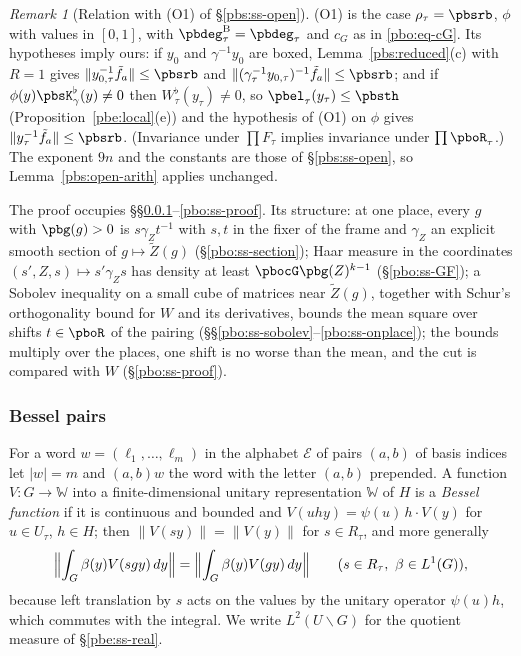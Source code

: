 \documentclass[10pt]{amsart}
\theoremstyle{definition}
\theoremstyle{remark}
\newtheorem{remark}[theorem]{Remark}
\begin{document}
\begin{remark}[Relation with \textup{(O1)} of \S\ref{pbs:ss-open}]\label{pbo:rem-O1}
\textup{(O1)} is the case $\rho_\tau=\pbsrb$, $\phi$ with values in $[0,1]$, with $\pbdeg^{\mathrm B}_\tau=
\pbdeg_\tau$ and $c_G$ as in \eqref{pbo:eq-cG}. Its hypotheses imply ours: if $y_0$ and $\gamma^{-1}y_0$
are boxed, Lemma~\ref{pbs:reduced}(c) with $R=1$ gives $\|y_{0,\tau}^{-1}\tilde f_a\|\le\pbsrb$ and
$\|(\gamma_\tau^{-1}y_{0,\tau})^{-1}\tilde f_a\|\le\pbsrb$; and if $\phi(y)\pbsK^\flat_\gamma(y)\ne0$ then
$W^\flat_\tau(y_\tau)\ne0$, so $\pbel_\tau(y_\tau)\le\pbsth$ (Proposition~\ref{pbe:local}(e)) and the
hypothesis of \textup{(O1)} on $\phi$ gives $\|y_\tau^{-1}\tilde f_a\|\le\pbsrb$. (Invariance under
$\prod F_\tau$ implies invariance under $\prod\pboR_\tau$.) The exponent $9n$ and the constants are
those of \S\ref{pbs:ss-open}, so Lemma~\ref{pbs:open-arith} applies unchanged.
\end{remark}

The proof occupies \S\S\ref{pbo:ss-system}--\ref{pbo:ss-proof}. Its structure: at one place, every
$g$ with $\pbg(g)>0$ is $s\gamma_Zt^{-1}$ with $s,t$ in the fixer of the frame and $\gamma_Z$ an
explicit smooth section of $g\mapsto\tilde Z(g)$ (\S\ref{pbo:ss-section}); Haar measure in the
coordinates $(s',Z,s)\mapsto s'\gamma_Zs$ has density at least $\pbocG\pbg(Z)^{k-1}$
(\S\ref{pbo:ss-GF}); a Sobolev inequality on a small cube of matrices near $\tilde Z(g)$, together
with Schur's orthogonality bound for $W$ and its derivatives, bounds the mean square over shifts
$t\in\pboR$ of the pairing (\S\S\ref{pbo:ss-sobolev}--\ref{pbo:ss-onplace}); the bounds multiply over
the places, one shift is no worse than the mean, and the cut is compared with $W$
(\S\ref{pbo:ss-proof}).

\subsubsection{Bessel pairs}\label{pbo:ss-system}

For a word $w=(\ell_1,\dots,\ell_m)$ in the alphabet $\mathcal E$ of pairs $(a,b)$ of basis indices
let $|w|=m$ and $(a,b)w$ the word with the letter $(a,b)$ prepended. A function $V\colon G\to\mathbb W$
into a finite-dimensional unitary representation $\mathbb W$ of $H$ is a \emph{Bessel function} if it
is continuous and bounded and $V(uhy)=\psi(u)\,h\cdot V(y)$ for $u\in U_\tau$, $h\in H$; then
$\|V(sy)\|=\|V(y)\|$ for $s\in R_\tau$, and more generally
\begin{equation}\label{pbo:eq-inv}
\Bigl\|\int_G\beta(y)V(sgy)\,dy\Bigr\|=\Bigl\|\int_G\beta(y)V(gy)\,dy\Bigr\|\qquad(s\in R_\tau,\ \beta\in
L^1(G)),
\end{equation}
because left translation by $s$ acts on the values by the unitary operator $\psi(u)h$, which
commutes with the integral. We write $L^2(U\backslash G)$ for the quotient measure of
\S\ref{pbe:ss-real}.
\end{document}

